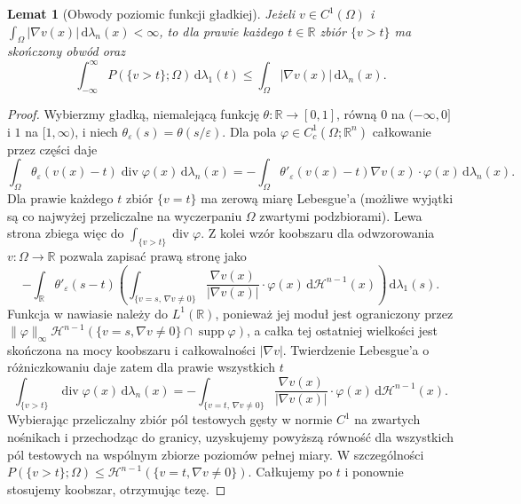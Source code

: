 \documentclass[11pt,a4paper,oneside]{book}
\numberwithin{equation}{chapter}
\theoremstyle{plain}
\newtheorem{lemat}[twierdzenie]{Lemat}
\theoremstyle{definition}
\theoremstyle{remark}
\begin{document}
\begin{lemat}[Obwody poziomic funkcji gładkiej]
\label{lem:BV-smooth-levels}
Jeżeli $v\in C^1(\Omega)$ i
$\int_\Omega|\nabla v(x)|\,\mathrm d\lambda_n(x)<\infty$,
to dla prawie każdego $t\in\mathbb R$
zbiór $\{v>t\}$ ma skończony obwód oraz
\[
 \int_{-\infty}^{\infty}P(\{v>t\};\Omega)
 \,\mathrm d\lambda_1(t)
 \le\int_\Omega|\nabla v(x)|\,\mathrm d\lambda_n(x).
\]
\end{lemat}
\begin{proof}
Wybierzmy gładką, niemalejącą funkcję
$\theta:\mathbb R\to[0,1]$, równą $0$ na
$(-\infty,0]$ i $1$ na $[1,\infty)$, i niech
$\theta_\varepsilon(s)=\theta(s/\varepsilon)$.
Dla pola $\varphi\in C_c^1(\Omega;\mathbb R^n)$
całkowanie przez części daje
\[
 \int_\Omega\theta_\varepsilon(v(x)-t)
 \operatorname{div}\varphi(x)\,\mathrm d\lambda_n(x)
 =-\int_\Omega\theta'_\varepsilon(v(x)-t)
 \nabla v(x)\cdot\varphi(x)\,\mathrm d\lambda_n(x).
\]
Dla prawie każdego $t$ zbiór $\{v=t\}$ ma
zerową miarę Lebesgue'a (możliwe wyjątki
są co najwyżej przeliczalne na wyczerpaniu
$\Omega$ zwartymi podzbiorami). Lewa strona
zbiega więc do $\int_{\{v>t\}}\operatorname{div}\varphi$.
Z kolei wzór koobszaru dla odwzorowania
$v:\Omega\to\mathbb R$ pozwala zapisać
prawą stronę jako
\[
 -\int_{\mathbb R}\theta'_\varepsilon(s-t)
 \left(\int_{\{v=s,\,\nabla v\ne0\}}
 \frac{\nabla v(x)}{|\nabla v(x)|}\cdot\varphi(x)
 \,\mathrm d\mathcal H^{n-1}(x)\right)
 \,\mathrm d\lambda_1(s).
\]
Funkcja w nawiasie należy do $L^1(\mathbb R)$,
ponieważ jej moduł jest ograniczony przez
$\|\varphi\|_\infty\mathcal H^{n-1}
(\{v=s,\nabla v\ne0\}\cap\operatorname{supp}\varphi)$,
a całka tej ostatniej wielkości jest skończona
na mocy koobszaru i całkowalności $|\nabla v|$.
Twierdzenie Lebesgue'a o różniczkowaniu daje
zatem dla prawie wszystkich $t$
\[
 \int_{\{v>t\}}\operatorname{div}\varphi(x)
 \,\mathrm d\lambda_n(x)
 =-\int_{\{v=t,\,\nabla v\ne0\}}
 \frac{\nabla v(x)}{|\nabla v(x)|}\cdot\varphi(x)
 \,\mathrm d\mathcal H^{n-1}(x).
\]
Wybierając przeliczalny zbiór pól testowych
gęsty w normie $C^1$ na zwartych nośnikach
i przechodząc do granicy, uzyskujemy powyższą
równość dla wszystkich pól testowych na
wspólnym zbiorze poziomów pełnej miary.
W szczególności
$P(\{v>t\};\Omega)\le
\mathcal H^{n-1}(\{v=t,\nabla v\ne0\})$.
Całkujemy po $t$ i ponownie stosujemy koobszar,
otrzymując tezę.
\end{proof}
\end{document}
